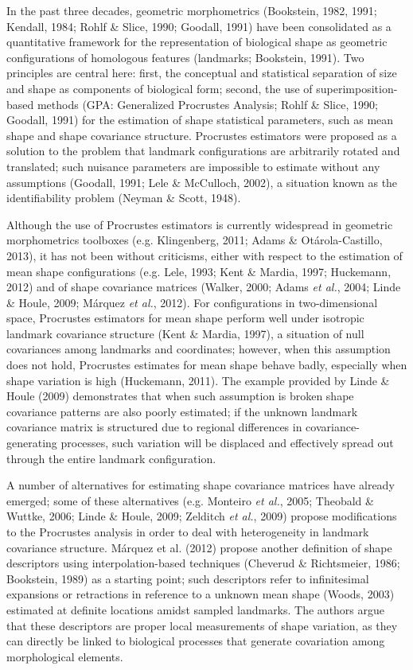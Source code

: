 \documentclass[12pt,twoside]{report}
\begin{document}
In the past three decades, geometric morphometrics (Bookstein, 1982,
1991; Kendall, 1984; Rohlf \& Slice, 1990; Goodall, 1991) have been
consolidated as a quantitative framework for the representation of
biological shape as geometric configurations of homologous features
(landmarks; Bookstein, 1991). Two principles are central here: first,
the conceptual and statistical separation of size and shape as
components of biological form; second, the use of superimposition-based
methods (GPA: Generalized Procrustes Analysis; Rohlf \& Slice, 1990;
Goodall, 1991) for the estimation of shape statistical parameters, such
as mean shape and shape covariance structure. Procrustes estimators were
proposed as a solution to the problem that landmark configurations are
arbitrarily rotated and translated; such nuisance parameters are
impossible to estimate without any assumptions (Goodall, 1991; Lele \&
McCulloch, 2002), a situation known as the identifiability problem
(Neyman \& Scott, 1948).

Although the use of Procrustes estimators is currently widespread in
geometric morphometrics toolboxes (e.g. Klingenberg, 2011; Adams \&
Otárola-Castillo, 2013), it has not been without criticisms, either with
respect to the estimation of mean shape configurations (e.g. Lele, 1993;
Kent \& Mardia, 1997; Huckemann, 2012) and of shape covariance matrices
(Walker, 2000; Adams \emph{et al.}, 2004; Linde \& Houle, 2009; Márquez
\emph{et al.}, 2012). For configurations in two-dimensional space,
Procrustes estimators for mean shape perform well under isotropic
landmark covariance structure (Kent \& Mardia, 1997), a situation of
null covariances among landmarks and coordinates; however, when this
assumption does not hold, Procrustes estimates for mean shape behave
badly, especially when shape variation is high (Huckemann, 2011). The
example provided by Linde \& Houle (2009) demonstrates that when such
assumption is broken shape covariance patterns are also poorly
estimated; if the unknown landmark covariance matrix is structured due
to regional differences in covariance-generating processes, such
variation will be displaced and effectively spread out through the
entire landmark configuration.

A number of alternatives for estimating shape covariance matrices have
already emerged; some of these alternatives (e.g. Monteiro \emph{et
al.}, 2005; Theobald \& Wuttke, 2006; Linde \& Houle, 2009; Zelditch
\emph{et al.}, 2009) propose modifications to the Procrustes analysis in
order to deal with heterogeneity in landmark covariance structure.
Márquez et al. (2012) propose another definition of shape descriptors
using interpolation-based techniques (Cheverud \& Richtsmeier, 1986;
Bookstein, 1989) as a starting point; such descriptors refer to
infinitesimal expansions or retractions in reference to a unknown mean
shape (Woods, 2003) estimated at definite locations amidst sampled
landmarks. The authors argue that these descriptors are proper local
measurements of shape variation, as they can directly be linked to
biological processes that generate covariation among morphological
elements.
\end{document}
